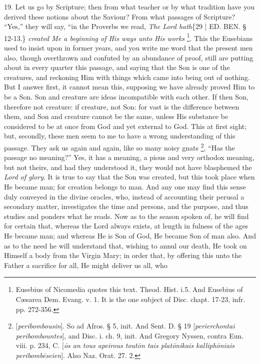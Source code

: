19. Let us go by Scripture;
then from what teacher or by what tradition have you derived these
notions about the Saviour? From what passages of Scripture? ``Yes,''
they will say, ``in the Proverbs we read, \emph{The Lord hath}\{29 | ED. BEN.
§ 12-13.\} \emph{created Me a beginning of His ways unto His works} \footnote{\emph{}Eusebius of Nicomedia quotes this text. Theod. Hist. i.\emph{}5.
And Eusebius of Cæsarea Dem. Evang. v. 1. It is the one subject of
Disc. chapt. 17-23, infr. pp. 272-356.}. This the Eusebians used to insist upon in former years, and
you write me word that the present men also, though overthrown and
confuted by an abundance of proof, still are putting about in every
quarter this passage, and saying that the Son is one of the creatures,
and reckoning Him with things which came into being out of nothing.
But I answer first, it cannot mean this, supposing we have already
proved Him to be a Son. Son and creature are ideas incompatible with
each other. If then Son, therefore not creature: if creature, not Son:
for vast is the difference between them, and Son and creature cannot
be the same, unless His substance be considered to be at once from God
and yet external to God. This at first sight; but, secondly, these men
seem to me to have a wrong understanding of this passage. They ask us
again and again, like so many noisy gnats \footnote{[\emph{peribombousin}]. So ad Afros. § 5, init. And Sent. D. § 19 [\emph{perierchontai
peribombountes}], and Disc. i. ch. 9, init. And Gregory Nyssen,
contra Eun. viii. p. 234, C. [\emph{\={o}s an tous apeirous tout\={o}n
tais plat\={o}nikais kalliph\={o}niais peribomb\={e}seien}].
Also Naz. Orat. 27. 2.}, ``Has the passage no meaning?'' Yes, it has a meaning, a pious
and very orthodox meaning, but not theirs, and had they understood it,
they would not have blasphemed the \emph{Lord of glory}. It is true to
say that the Son was created, but this took place when He became man;
for creation belongs to man. And any one may find this sense duly
conveyed in the divine oracles, who, instead of accounting their
perusal a secondary matter, investigates the time and persons, and the
purpose, and thus studies and ponders what he reads. Now as to the
season spoken of, he will find for certain that, whereas the Lord
always exists, at length in fulness of the ages He became man; and
whereas He is Son of God, He became Son of man also. And as to
the need he will understand that, wishing to annul our death, He took
on Himself a body from the Virgin Mary; in order that, by offering
this unto the Father a sacrifice for all, He might deliver us all, who
